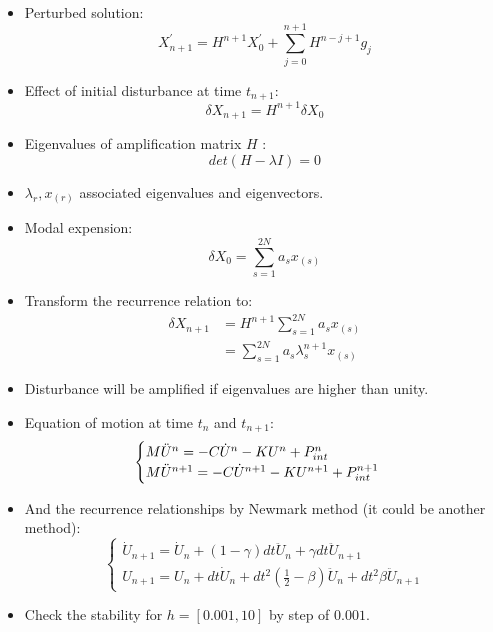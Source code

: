 \begin{frame}
\begin{itemize}
\item Perturbed solution:
\begin{equation}
X^\prime_{n+1} = H^{n+1}X_0^\prime + \sum^{n+1}_{j=0} H^{n-j+1}g_j
\end{equation}
\item Effect of initial disturbance at time $t_{n+1}$:
\begin{equation}
\delta X_{n+1} = H^{n+1} \delta X_0
\end{equation}
\item Eigenvalues of amplification matrix $H$ :
\begin{equation}
det(H-\lambda I) = 0
\end{equation}
\item $\lambda_r, x_{(r)}$ associated eigenvalues and eigenvectors.
\end{itemize}
\end{frame}
\begin{frame}
\begin{itemize}
\item Modal expension:
\begin{equation}
\delta X_0 = \sum^{2N}_{s=1} a_s x_{(s)}
\end{equation}
\item Transform the recurrence relation to:
\begin{align}
\delta X_{n+1} &= H^{n+1} \sum^{2N}_{s=1} a_s x_{(s)} \\
&= \sum^{2N}_{s=1} a_s \lambda_s^{n+1} x_{(s)}
\end{align} 
\item Disturbance will be amplified if eigenvalues are higher than unity.
\end{itemize}
\end{frame}

\begin{frame}
\begin{itemize}
\item Equation of motion at time $t_{n}$ and $t_{n+1}$:
\begin{equation}
\begin{cases}
    M  \Ddot{U}^n = -C \Dot{U}^n - K U^n +P_{int}^n \\
    M \Ddot{U}^{n+1} = -C \Dot{U}^{n+1} - K U^{n+1} +P_{int}^{n+1} 
\end{cases}
\end{equation}
\item And the recurrence relationships by Newmark method (it could be another method):
\begin{equation}
\begin{cases}
\dot{U}_{n+1} = \dot{U}_n + (1-\gamma)dt \ddot{U}_n + \gamma dt \ddot{U}_{n+1} \\
U_{n+1} = U_n +dt \dot{U}_n + dt^2 \left(\frac{1}{2}-\beta\right) \ddot{U}_n + dt^2 \beta \ddot{U}_{n+1}
\end{cases}
\end{equation}
\item Check the stability for $h = [0.001, 10]$ by step of $0.001$. 
\end{itemize}
\end{frame}
